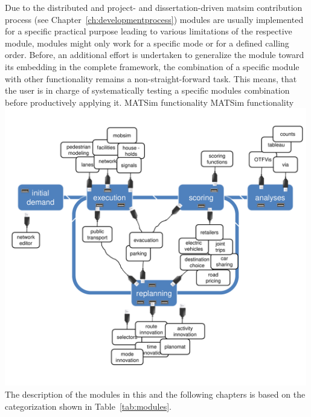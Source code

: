 Due to the distributed and project- and dissertation-driven \gls{matsim} contribution process (see Chapter~\ref{ch:developmentprocess}) modules are usually implemented for a specific practical purpose leading to various limitations of the respective module, \eg modules might only work for a specific mode or for a defined calling order. Before, an additional effort is undertaken to generalize the module toward its embedding in the complete framework, the combination of a specific module with other functionality remains a non-straight-forward task. This means, that the user is in charge of systematically testing a specific modules combination before productively applying it.
%
\createfigure%
{MATSim functionality}%
{MATSim functionality}%
{\label{fig:matsimmodules}}%
{\includegraphics[width=0.99\textwidth, angle=0]{extending/figures/modules.pdf}}%
{}
The description of the modules in this and the following chapters is based on the categorization shown in Table~\ref{tab:modules}.
%

